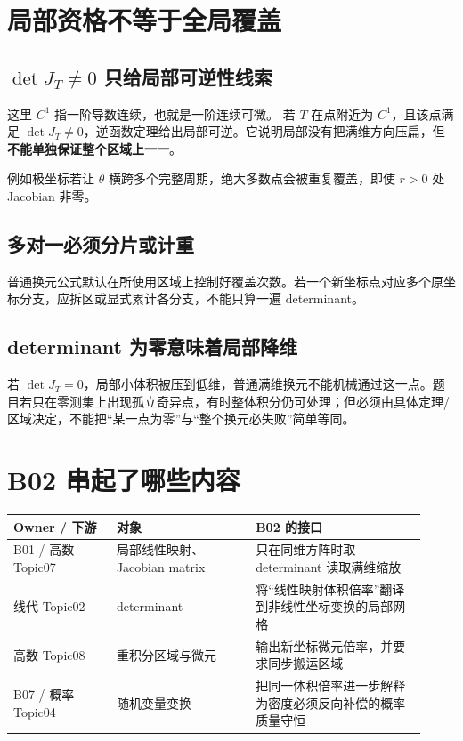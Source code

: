 \documentclass[profile=standard]{ipara-handbook}
\begin{document}
\section{局部资格不等于全局覆盖}
\subsection{$\det J_T\neq0$ 只给局部可逆性线索}
这里 $C^1$ 指一阶导数连续，也就是一阶连续可微。
若 $T$ 在点附近为 $C^1$，且该点满足 $\det J_T\neq0$，逆函数定理给出局部可逆。它说明局部没有把满维方向压扁，但\textbf{不能单独保证整个区域上一一}。

例如极坐标若让 $\theta$ 横跨多个完整周期，绝大多数点会被重复覆盖，即使 $r>0$ 处 Jacobian 非零。

\subsection{多对一必须分片或计重}
普通换元公式默认在所使用区域上控制好覆盖次数。若一个新坐标点对应多个原坐标分支，应拆区或显式累计各分支，不能只算一遍 determinant。

\subsection{determinant 为零意味着局部降维}
若 $\det J_T=0$，局部小体积被压到低维，普通满维换元不能机械通过这一点。题目若只在零测集上出现孤立奇异点，有时整体积分仍可处理；但必须由具体定理/区域决定，不能把“某一点为零”与“整个换元必失败”简单等同。

\section{B02 串起了哪些内容}
\begin{tabular}{p{0.23\linewidth}p{0.31\linewidth}p{0.38\linewidth}}
\hline
Owner / 下游 & 对象 & B02 的接口\\
\hline
B01 / 高数 Topic07 & 局部线性映射、Jacobian matrix & 只在同维方阵时取 determinant 读取满维缩放\\
线代 Topic02 & determinant & 将“线性映射体积倍率”翻译到非线性坐标变换的局部网格\\
高数 Topic08 & 重积分区域与微元 & 输出新坐标微元倍率，并要求同步搬运区域\\
B07 / 概率 Topic04 & 随机变量变换 & 把同一体积倍率进一步解释为密度必须反向补偿的概率质量守恒\\
\hline
\end{tabular}
\end{document}
